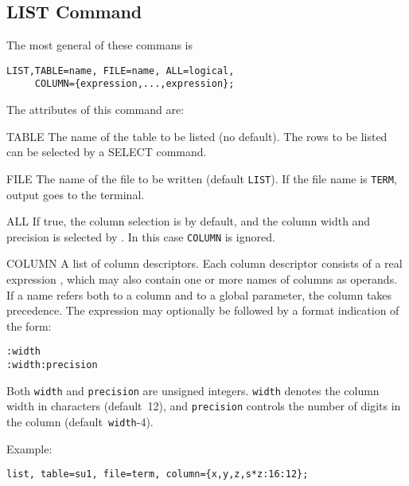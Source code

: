 \subsection{LIST Command}
The most general of these commans is
\begin{verbatim}
LIST,TABLE=name, FILE=name, ALL=logical,
     COLUMN={expression,...,expression};
\end{verbatim}
The attributes of this command are:
\begin{kdescription}
\item[TABLE]
  The name of the table to be listed (no default).
  The rows to be listed can be selected by a
  {SELECT}  command.
\item[FILE]
  The name of the file to be written (default \texttt{LIST}).
  If the file name is \texttt{TERM}, output goes to the terminal.
\item[ALL]
  If true, the column selection is by default, and the column width
  and precision is selected by \opal .
  In this case \texttt{COLUMN} is ignored.
\item[COLUMN]
  A list of column descriptors.
  Each column descriptor consists of a real expression ,
  which may also contain one or more names of columns as operands.
  If a name refers both to a column and to a global parameter,
  the column takes precedence.
  The expression may optionally be followed by a format indication of
  the form:
\begin{verbatim}
:width
:width:precision
\end{verbatim}
  Both \texttt{width} and \texttt{precision} are unsigned integers.
  \texttt{width} denotes the column width in characters (default~12),
  and \texttt{precision} controls the number of digits in the column
  (default~\texttt{width}-4).
\end{kdescription}
Example:
\begin{verbatim}
list, table=su1, file=term, column={x,y,z,s*z:16:12};
\end{verbatim}

